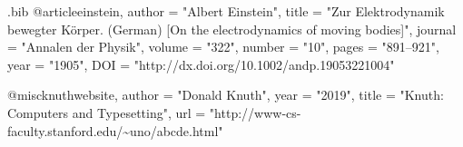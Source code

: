 \documentclass{article}
\begin{document}
\newpage
%
%


\begin{filecontents}[overwrite]{\jobname.bib}
@article{einstein,
    author =       "Albert Einstein",
    title =        "{Zur Elektrodynamik bewegter K{\"o}rper}. ({German})
        [{On} the electrodynamics of moving bodies]",
    journal =      "Annalen der Physik",
    volume =       "322",
    number =       "10",
    pages =        "891--921",
    year =         "1905",
    DOI =          "http://dx.doi.org/10.1002/andp.19053221004"
}


@misc{knuthwebsite,
    author    =  "Donald Knuth",
    year      = "2019",
    title     = "Knuth: Computers and Typesetting",
    url       = "http://www-cs-faculty.stanford.edu/\~{}uno/abcde.html"
}
\end{filecontents}



\end{document}
